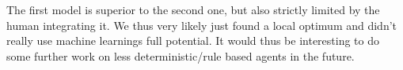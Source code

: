 The first model is superior to the second one, but also strictly limited by the human integrating it. We thus very likely just found a local optimum and didn't really use machine learnings full potential. It would thus be interesting to do some further work on less deterministic/rule based agents in the future.